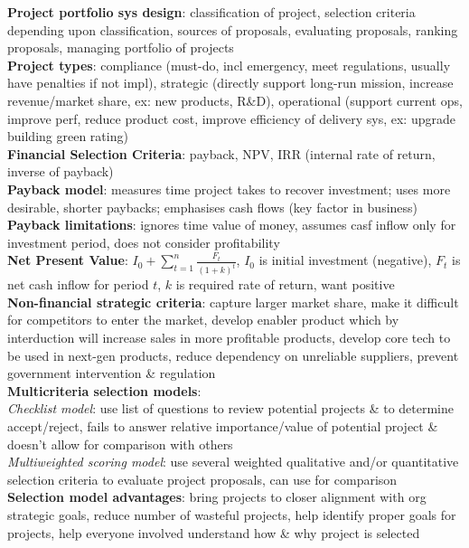 \documentclass[a4paper]{article}
\begin{document}
\begin{multicols}{3}
        \textbf{Project portfolio sys design}: classification of project, selection criteria depending upon classification, sources of proposals, evaluating proposals, ranking proposals, managing portfolio of projects\\
        \textbf{Project types}: compliance (must-do, incl emergency, meet regulations, usually have penalties if not impl), strategic (directly support long-run mission, increase revenue/market share, ex: new products, R\&D), operational (support current ops, improve perf, reduce product cost, improve efficiency of delivery sys, ex: upgrade building green rating)\\
        \textbf{Financial Selection Criteria}: payback, NPV, IRR (internal rate of return, inverse of payback)\\
        \textbf{Payback model}: measures time project takes to recover investment; uses more desirable, shorter paybacks; emphasises cash flows (key factor in business)\\
        \textbf{Payback limitations}: ignores time value of money, assumes casf inflow only for investment period, does not consider profitability\\
        \textbf{Net Present Value}: $I_0 + \sum\nolimits_{t=1}^n\frac{F_t}{{(1 + k)}^t}$, $I_0$ is initial investment (negative), $F_t$ is net cash inflow for period $t$, $k$ is required rate of return, want positive\\
        \textbf{Non-financial strategic criteria}: capture larger market share, make it difficult for competitors to enter the market, develop enabler product which by interduction will increase sales in more profitable products, develop core tech to be used in next-gen products, reduce dependency on unreliable suppliers, prevent government intervention \& regulation\\
        \textbf{Multicriteria selection models}:\\
        \textit{Checklist model}: use list of questions to review potential projects \& to determine accept/reject, fails to answer relative importance/value of potential project \& doesn't allow for comparison with others\\
        \textit{Multiweighted scoring model}: use several weighted qualitative and/or quantitative selection criteria to evaluate project proposals, can use for comparison\\
        \textbf{Selection model advantages}: bring projects to closer alignment with org strategic goals, reduce number of wasteful projects, help identify proper goals for projects, help everyone involved understand how \& why project is selected\\

\end{multicols}
\end{document}
